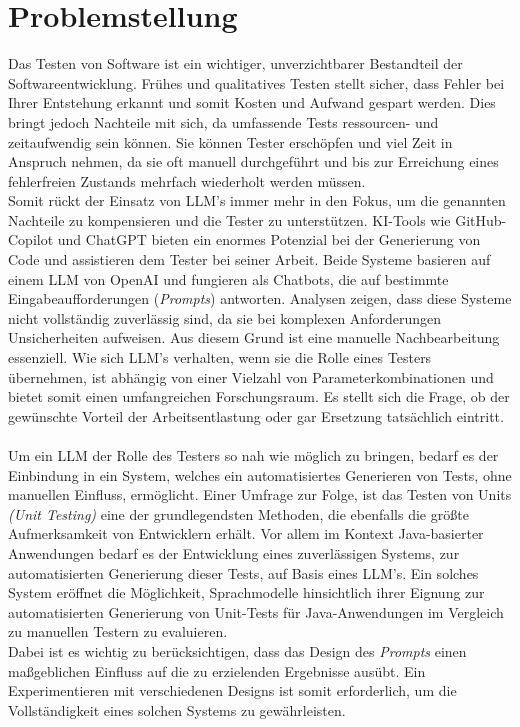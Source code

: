 \section{Problemstellung}
Das Testen von Software ist ein wichtiger, unverzichtbarer Bestandteil der Softwareentwicklung. Frühes und qualitatives Testen stellt sicher, dass Fehler bei Ihrer Entstehung erkannt und somit Kosten und Aufwand gespart werden. Dies bringt jedoch Nachteile mit sich, da umfassende Tests ressourcen- und zeitaufwendig sein können. Sie können Tester erschöpfen und viel Zeit in Anspruch nehmen, da sie oft manuell durchgeführt und bis zur Erreichung eines fehlerfreien Zustands mehrfach wiederholt werden müssen. \cite{pargaonkar_study_2023}\\ Somit rückt der Einsatz von LLM's immer mehr in den Fokus, um die genannten Nachteile zu kompensieren und die Tester zu unterstützen. KI-Tools wie GitHub-Copilot und ChatGPT bieten ein enormes Potenzial bei der Generierung von Code und assistieren dem Tester bei seiner Arbeit. Beide Systeme basieren auf einem LLM von OpenAI und fungieren als Chatbots, die auf bestimmte Eingabeaufforderungen (\textit{Prompts}) antworten. Analysen zeigen, dass diese Systeme nicht vollständig zuverlässig sind, da sie bei komplexen Anforderungen Unsicherheiten aufweisen. \cite{poldrack_ai-assisted_2023} Aus diesem Grund ist eine manuelle Nachbearbeitung essenziell. Wie sich LLM's verhalten, wenn sie die Rolle eines Testers übernehmen, ist abhängig von einer Vielzahl von Parameterkombinationen und bietet somit einen umfangreichen Forschungsraum. Es stellt sich die Frage, ob der gewünschte Vorteil der Arbeitsentlastung oder gar Ersetzung tatsächlich eintritt.\\\\ Um ein LLM der Rolle des Testers so nah wie möglich zu bringen, bedarf es der Einbindung in ein System, welches ein automatisiertes Generieren von Tests, ohne manuellen Einfluss, ermöglicht. Einer Umfrage zur Folge, ist das Testen von Units \textit{(Unit Testing)} eine der grundlegendsten Methoden, die ebenfalls die größte Aufmerksamkeit von Entwicklern erhält. \cite{garousi_survey_2013} Vor allem im Kontext Java-basierter Anwendungen bedarf es der Entwicklung eines zuverlässigen Systems, zur automatisierten Generierung dieser Tests, auf Basis eines LLM's. Ein solches System eröffnet die Möglichkeit, Sprachmodelle hinsichtlich ihrer Eignung zur automatisierten Generierung von Unit-Tests für Java-Anwendungen im Vergleich zu manuellen Testern zu evaluieren.\\ Dabei ist es wichtig zu berücksichtigen, dass das Design des \textit{Prompts} einen maßgeblichen Einfluss auf die zu erzielenden Ergebnisse ausübt. Ein Experimentieren mit verschiedenen Designs ist somit erforderlich, um die Vollständigkeit eines solchen Systems zu gewährleisten.


